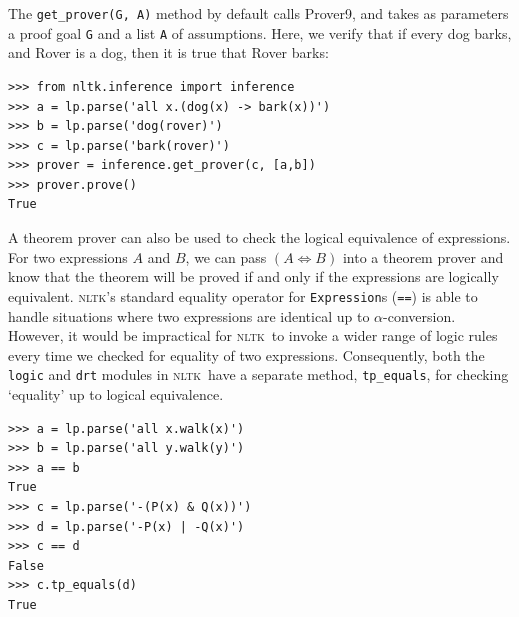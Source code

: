 \documentclass[11pt, a4paper]{article}
\newcommand{\NLTK}{\textsc{nltk}}
\begin{document}
The \verb!get_prover(G, A)! method by default calls Prover9, and takes as
parameters a proof goal \texttt{G} and a list \texttt{A} of assumptions.
Here, we verify that if every dog barks, and Rover is a dog,
then it is true that Rover barks:
\begin{Verbatim}
>>> from nltk.inference import inference
>>> a = lp.parse('all x.(dog(x) -> bark(x))')
>>> b = lp.parse('dog(rover)')
>>> c = lp.parse('bark(rover)')
>>> prover = inference.get_prover(c, [a,b])
>>> prover.prove()
True
\end{Verbatim}

A theorem prover can also be used to check the logical equivalence of
expressions.  For two expressions $A$ and $B$, we can pass $(A\iff B)$
into a theorem prover and know that the theorem will be proved if and
only if the expressions are logically equivalent.  \NLTK's standard
equality operator for \texttt{Expression}s (\texttt{==}) is able to
handle situations where two expressions are identical up to
$\alpha$-conversion.  However, it would be impractical for \NLTK\ to
invoke a wider range of logic rules every time we checked for equality
of two expressions. Consequently, both the \texttt{logic} and 
\texttt{drt} modules in \NLTK\ 
have a separate method, \texttt{tp\_equals}, for checking `equality'
up to logical equivalence.

\begin{Verbatim}
>>> a = lp.parse('all x.walk(x)')
>>> b = lp.parse('all y.walk(y)')
>>> a == b
True
>>> c = lp.parse('-(P(x) & Q(x))')
>>> d = lp.parse('-P(x) | -Q(x)')
>>> c == d
False
>>> c.tp_equals(d)
True
\end{Verbatim}


\end{document}
